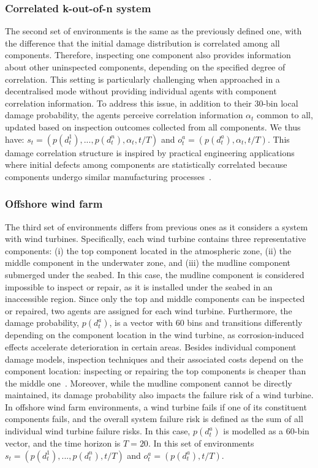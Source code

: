 \subsubsection{Correlated k-out-of-n system}
The second set of environments is the same as the previously defined one, with the difference that the initial damage distribution is correlated among all components.
Therefore, inspecting one component also provides information about other uninspected components, depending on the specified degree of correlation.
This setting is particularly challenging when approached in a decentralised mode without providing individual agents with component correlation information.
To address this issue, in addition to their 30-bin local damage probability, the agents perceive correlation information $\alpha_t$ common to all, updated based on inspection outcomes collected from all components.
We thus have: $s_t = (p(d^1_t),..., p(d^n_t),\alpha_t, t/T)$ and $o^a_t=(p(d^a_t), \alpha_t, t/T)$.
This damage correlation structure is inspired by practical engineering applications where initial defects among components are statistically correlated because components undergo similar manufacturing processes~\citep{morato2022optimal}.

\subsubsection{Offshore wind farm}
The third set of environments differs from previous ones as it considers a system with wind turbines.
Specifically, each wind turbine contains three representative components: (i) the top component located in the atmospheric zone, (ii) the middle component in the underwater zone, and (iii) the mudline component submerged under the seabed.
In this case, the mudline component is considered impossible to inspect or repair, as it is installed under the seabed in an inaccessible region.
Since only the top and middle components can be inspected or repaired, two agents are assigned for each wind turbine.
Furthermore, the damage probability, $p(d^a_t)$, is a vector with 60 bins and transitions differently depending on the component location in the wind turbine, as corrosion-induced effects accelerate deterioration in certain areas.
Besides individual component damage models, inspection techniques and their associated costs depend on the component location: inspecting or repairing the top components is cheaper than the middle one~\citep{giro2022inspection}.
Moreover, while the mudline component cannot be directly maintained, its damage probability also impacts the failure risk of a wind turbine.
In offshore wind farm environments, a wind turbine fails if one of its constituent components fails, and the overall system failure risk is defined as the sum of all individual wind turbine failure risks. In this case, $p(d^a_t)$ is modelled as a 60-bin vector, and the time horizon is $T=20$.
In this set of environments $s_t = (p(d^1_t),..., p(d^n_t), t/T)$ and $o^a_t=(p(d^a_t), t/T)$.

